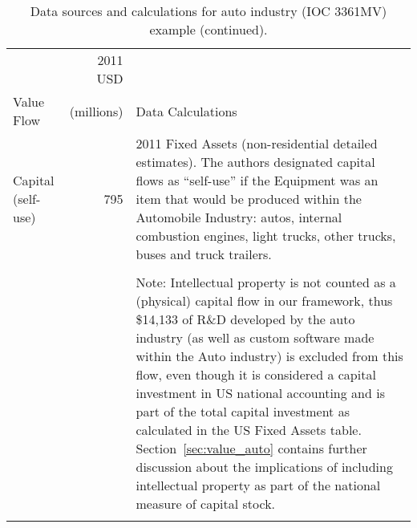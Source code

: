 \begin{table}[H]
\caption[Data sources and calculations for auto industry example]{Data sources and calculations for auto industry (IOC 3361MV) example (continued).}
\begin{center}
  \begin{tabular}{l r @{\hspace{2em}} p{7cm}}
   \toprule 
                    & 2011 USD      &   \\ 
Value Flow          & (millions)    & Data Calculations \\
	\midrule

Capital (self-use) &  795    & 2011  Fixed Assets (non-residential detailed estimates).
	The authors designated capital flows as ``self-use'' if the Equipment was 	
	an item that would be produced within the Automobile Industry: 
	autos, internal combustion engines, light trucks, 
	other trucks, buses and truck trailers. \\
&\\

&&  Note: Intellectual property is not
	counted as a (physical) capital flow in our framework, thus
	\$14,133 of  R\&D developed by the auto industry (as well as custom software made within the Auto industry)
	is excluded from this flow, even though it is considered a capital investment 	
	in  US national accounting and is part of the total capital investment
	as calculated in the US Fixed Assets table. Section~\ref{sec:value_auto}
	contains further discussion about the implications of including
	intellectual property as part of the national measure of capital stock. \\

&&\\




\end{tabular}
\end{center}
\end{table}
